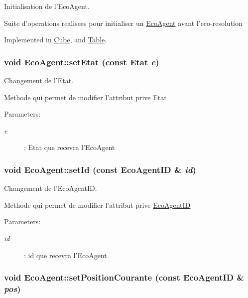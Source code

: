 Initialisation de l'EcoAgent. 

Suite d'operations realisees pour initialiser un \hyperlink{classEcoAgent}{EcoAgent} avant l'eco-resolution 

Implemented in \hyperlink{classCube_6687c2575f4ce927f6b3032fb46040eb}{Cube}, and \hyperlink{classTable_964952b5f899c8abb64e9622a8457466}{Table}.\hypertarget{classEcoAgent_e06a7430bd88705a327cf498c8420a2b}{
\subsubsection[{setEtat}]{\setlength{\rightskip}{0pt plus 5cm}void EcoAgent::setEtat (const {\bf Etat} {\em e})}}
\label{classEcoAgent_e06a7430bd88705a327cf498c8420a2b}


Changement de l'Etat. 

Methode qui permet de modifier l'attribut prive Etat

\begin{Desc}
\item[Parameters:]
\begin{description}
\item[{\em e}]: Etat que recevra l'EcoAgent \end{description}
\end{Desc}
\hypertarget{classEcoAgent_ef2dde1272916b9f3a8f5a663bf96f69}{
\subsubsection[{setId}]{\setlength{\rightskip}{0pt plus 5cm}void EcoAgent::setId (const {\bf EcoAgentID} \& {\em id})}}
\label{classEcoAgent_ef2dde1272916b9f3a8f5a663bf96f69}


Changement de l'EcoAgentID. 

Methode qui permet de modifier l'attribut prive \hyperlink{classEcoAgentID}{EcoAgentID}

\begin{Desc}
\item[Parameters:]
\begin{description}
\item[{\em id}]: id que recevra l'EcoAgent \end{description}
\end{Desc}
\hypertarget{classEcoAgent_0365707b7bc808dd45fb34d1c076f362}{
\subsubsection[{setPositionCourante}]{\setlength{\rightskip}{0pt plus 5cm}void EcoAgent::setPositionCourante (const {\bf EcoAgentID} \& {\em pos})}}
\label{classEcoAgent_0365707b7bc808dd45fb34d1c076f362}


